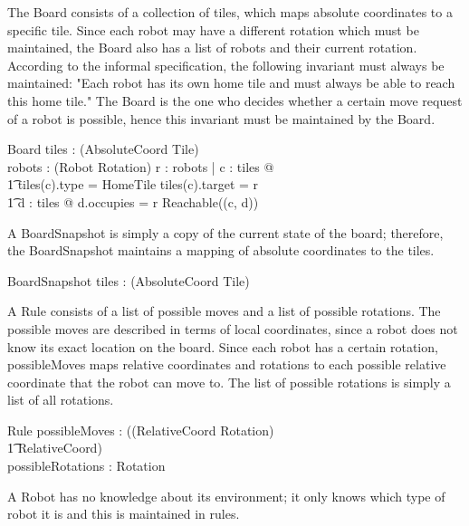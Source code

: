 \documentclass[12pt]{article}
\begin{document}
The Board consists of a collection of tiles, which maps absolute coordinates to a specific tile. Since each robot may have a different rotation which must be maintained, the Board also has a list of robots and their current rotation. \\
According to the informal specification, the following invariant must always be maintained: "Each robot has its own home tile and must always be able to reach this home tile." The Board is the one who decides whether a certain move request of a robot is possible, hence this invariant must be maintained by the Board.

\begin{schema}{Board}
tiles : \power (AbsoluteCoord \fun Tile) \\
robots : \power (Robot \fun Rotation)
\where
\forall r : robots | \exists c : \dom tiles @  \\ \t1 tiles(c).type = HomeTile \wedge tiles(c).target = r \wedge \\ \t1
\exists d : \dom tiles @ d.occupies = r \wedge Reachable((c, d))
\end{schema}

A BoardSnapshot is simply a copy of the current state of the board; therefore, the BoardSnapshot maintains a mapping of absolute coordinates to the tiles.

\begin{schema}{BoardSnapshot}
tiles : \power (AbsoluteCoord \fun Tile) \\
\end{schema}

A Rule consists of a list of possible moves and a list of possible rotations. The possible moves are described in terms of local coordinates, since a robot does not know its exact location on the board. Since each robot has a certain rotation, possibleMoves maps relative coordinates and rotations to each possible relative coordinate that the robot can move to. The list of possible rotations is simply a list of all rotations.

\begin{schema}{Rule}
possibleMoves : \power ((RelativeCoord \times Rotation) \psurj \\ \t1 \seq RelativeCoord) \\
possibleRotations : \power Rotation
\end{schema}

A Robot has no knowledge about its environment; it only knows which type of robot it is and this is maintained in rules. 
\end{document}
